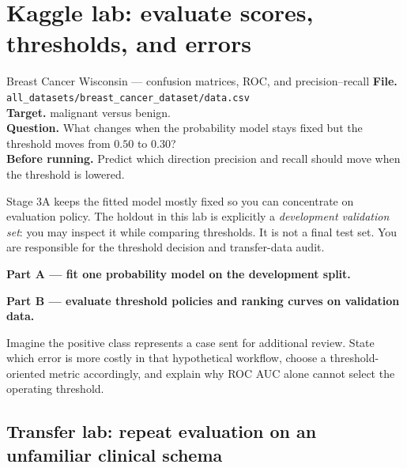 \section{Kaggle lab: evaluate scores, thresholds, and errors}
\label{sec:kaggle-breast-evaluation}

\begin{kaggleproject}{Breast Cancer Wisconsin --- confusion matrices, ROC, and precision--recall}
\textbf{File.} \texttt{all\_datasets/breast\_cancer\_dataset/data.csv}\\
\textbf{Target.} malignant versus benign.\\
\textbf{Question.} What changes when the probability model stays fixed but the threshold moves from $0.50$ to $0.30$?\\
\textbf{Before running.} Predict which direction precision and recall should move when the threshold is lowered.

\begin{labmode}
Stage 3A keeps the fitted model mostly fixed so you can concentrate on evaluation policy. The holdout in this lab is explicitly a \emph{development validation set}: you may inspect it while comparing thresholds. It is not a final test set. You are responsible for the threshold decision and transfer-data audit.
\end{labmode}

\textbf{Part A --- fit one probability model on the development split.}



\newpage
\textbf{Part B --- evaluate threshold policies and ranking curves on validation data.}



\begin{decisionmemo}
Imagine the positive class represents a case sent for additional review. State which error is more costly in that hypothetical workflow, choose a threshold-oriented metric accordingly, and explain why ROC AUC alone cannot select the operating threshold.
\end{decisionmemo}
\end{kaggleproject}

\subsection{Transfer lab: repeat evaluation on an unfamiliar clinical schema}

